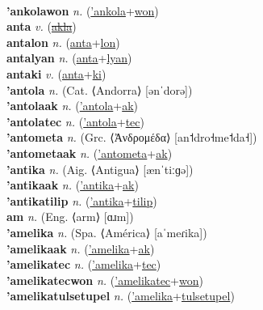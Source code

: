  \label{'ankolaak} \\
\textbf{'ankolawon} \textit{n.} (\hyperref['ankola]{'ankola}+\hyperref[won]{won})
 \label{'ankolawon} \\
\textbf{anta} \textit{v.} (\hyperref[akla]{\sout{akla}})
 \label{anta} \\
\textbf{antalon} \textit{n.} (\hyperref[anta]{anta}+\hyperref[lon]{lon})
 \label{antalon} \\
\textbf{antalyan} \textit{n.} (\hyperref[anta]{anta}+\hyperref[lyan]{lyan})
 \label{antalyan} \\
\textbf{antaki} \textit{v.} (\hyperref[anta]{anta}+\hyperref[ki]{ki})
 \label{antaki} \\
\textbf{'antola} \textit{n.} (Cat. ⟨Andorra⟩ [ənˈdorə])
 \label{'antola} \\
\textbf{'antolaak} \textit{n.} (\hyperref['antola]{'antola}+\hyperref[ak]{ak})
 \label{'antolaak} \\
\textbf{'antolatec} \textit{n.} (\hyperref['antola]{'antola}+\hyperref[tec]{tec})
 \label{'antolatec} \\
\textbf{'antometa} \textit{n.} (Grc. ⟨Ἀνδρομέδα⟩ [an˦dro˧me˦da˧])
 \label{'antometa} \\
\textbf{'antometaak} \textit{n.} (\hyperref['antometa]{'antometa}+\hyperref[ak]{ak})
 \label{'antometaak} \\
\textbf{'antika} \textit{n.} (Aig. ⟨Antigua⟩ [ænˈtiːɡə])
 \label{'antika} \\
\textbf{'antikaak} \textit{n.} (\hyperref['antika]{'antika}+\hyperref[ak]{ak})
 \label{'antikaak} \\
\textbf{'antikatilip} \textit{n.} (\hyperref['antika]{'antika}+\hyperref[tilip]{tilip})
 \label{'antikatilip} \\
\textbf{am} \textit{n.} (Eng. ⟨arm⟩ [ɑɹm])
 \label{am} \\
\textbf{'amelika} \textit{n.} (Spa. ⟨América⟩ [aˈmeɾika])
 \label{'amelika} \\
\textbf{'amelikaak} \textit{n.} (\hyperref['amelika]{'amelika}+\hyperref[ak]{ak})
 \label{'amelikaak} \\
\textbf{'amelikatec} \textit{n.} (\hyperref['amelika]{'amelika}+\hyperref[tec]{tec})
 \label{'amelikatec} \\
\textbf{'amelikatecwon} \textit{n.} (\hyperref['amelikatec]{'amelikatec}+\hyperref[won]{won})
 \label{'amelikatecwon} \\
\textbf{'amelikatulsetupel} \textit{n.} (\hyperref['amelika]{'amelika}+\hyperref[tulsetupel]{tulsetupel})
 \label{'amelikatulsetupel} \\
